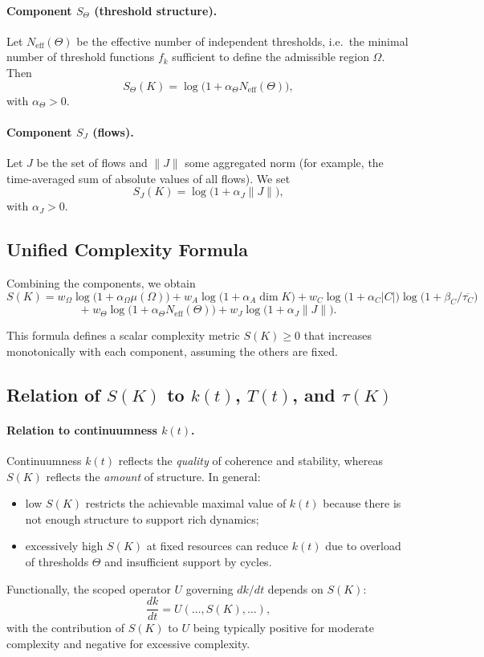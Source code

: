 \paragraph{Component \texorpdfstring{\(S_\Theta\)}{S_\Theta} (threshold structure).}
Let \(N_{\mathrm{eff}}(\Theta)\) be the effective number of independent thresholds, i.e.\ the minimal number of threshold functions \(f_k\) sufficient to define the admissible region \(\Omega\).
Then
\[
  S_\Theta(K) = \log\bigl(1+\alpha_\Theta N_{\mathrm{eff}}(\Theta)\bigr),
\]
with \(\alpha_\Theta>0\).

\paragraph{Component \texorpdfstring{\(S_J\)}{S_J} (flows).}
Let \(J\) be the set of flows and \(\|J\|\) some aggregated norm (for example, the time-averaged sum of absolute values of all flows).
We set
\[
  S_J(K) = \log\bigl(1+\alpha_J \|J\|\bigr),
\]
with \(\alpha_J>0\).

\subsection{Unified Complexity Formula}

Combining the components, we obtain
\begin{equation}
  S(K) =
  w_\Omega \log\bigl(1+\alpha_\Omega \mu(\Omega)\bigr)
  + w_A \log\bigl(1+\alpha_A \dim K\bigr)
  + w_C \log\bigl(1+\alpha_C |C|\bigr)\log\bigl(1+\beta_C/\overline{\tau_C}\bigr)
\end{equation}
\[
  +\; w_\Theta \log\bigl(1+\alpha_\Theta N_{\mathrm{eff}}(\Theta)\bigr)
  + w_J \log\bigl(1+\alpha_J \|J\|\bigr).
\]

This formula defines a scalar complexity metric \(S(K)\ge 0\) that increases monotonically with each component, assuming the others are fixed.

\subsection{Relation of \(S(K)\) to \(k(t)\), \(T(t)\), and \(\tau(K)\)}

\paragraph{Relation to continuumness \(k(t)\).}
Continuumness \(k(t)\) reflects the \emph{quality} of coherence and stability, whereas \(S(K)\) reflects the \emph{amount} of structure.
In general:
\begin{itemize}
  \item low \(S(K)\) restricts the achievable maximal value of \(k(t)\) because there is not enough structure to support rich dynamics;
  \item excessively high \(S(K)\) at fixed resources can reduce \(k(t)\) due to overload of thresholds \(\Theta\) and insufficient support by cycles.
\end{itemize}
Functionally, the scoped operator \(U\) governing \(dk/dt\) depends on \(S(K)\):
\[
  \frac{dk}{dt} = U(\ldots,S(K),\ldots),
\]
with the contribution of \(S(K)\) to \(U\) being typically positive for moderate complexity and negative for excessive complexity.

